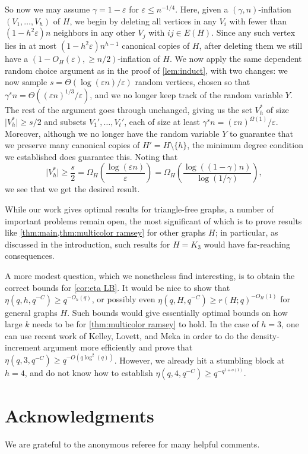 \documentclass{aic}
\theoremstyle{plain}
\theoremstyle{remark}
\newcommand{\eps}{\ensuremath{\varepsilon}}
\newcommand\ab[1]{\lvert #1 \rvert}
\begin{document}
So now we may assume $\gamma = 1-\eps $ for $ \eps \le n^{-1/4}$. Here, given a $(\gamma,n)$-inflation $(V_1,\dots,V_h)$ of $H$, we begin by deleting all vertices in any $V_i$ with fewer than $(1-h^2\eps)n$ neighbors in any other $V_j$ with $ij \in E(H)$. Since any such vertex lies in at most $(1-h^2\eps) n^{h-1}$ canonical copies of $H$, after deleting them we still have a $(1-O_H(\eps), \geq n/2)$-inflation of $H$. We now apply the same dependent random choice argument as in the proof of \cref{lem:induct}, with two changes: we now sample $s = \Theta(\log(\eps n)/\eps)$ random vertices, chosen so that $\gamma^s n = \Theta((\eps n)^{1/3}/\eps)$, and we no longer keep track of the random variable $Y$. The rest of the argument goes through unchanged, giving us the set $V_h^*$ of size $\ab{V_h^*}\geq s/2$ and subsets $V_1',\dots,V_t'$, each of size at least $\gamma^s n = (\eps n)^{\Omega(1)}/\eps$. Moreover, although we no longer have the random variable $Y$ to guarantee that we preserve many canonical copies of $H' = H \setminus \{h\}$, the minimum degree condition we established does guarantee this. Noting that
\[
\ab{V_h^*} \geq \frac s2 = \Omega_H \left(\frac{\log(\eps n)}{\eps}\right) = \Omega_H \left( \frac{\log((1-\gamma)n)}{\log(1/\gamma)}\right),
\]
we see that we get the desired result.

While our work gives optimal results for triangle-free graphs, a number of important problems remain open,
the most significant of which is to prove results like \cref{thm:main,thm:multicolor ramsey} for other graphs $H$; in particular, as discussed in the introduction, such results for $H=K_3$ would have far-reaching consequences.

A more modest question, which we nonetheless find interesting, is to obtain the  correct bounds for \cref{cor:eta LB}. It would be nice to show that $\eta(q,h, q^{-C})\geq q^{-O_h(q)}$, or possibly even $\eta(q, H, q^{-C})\geq r(H;q)^{-O_H(1)}$ for general graphs $H$. Such bounds would give essentially optimal bounds on how large $k$ needs to be for \cref{thm:multicolor ramsey} to hold. In the case of $h=3$, one can use recent work of Kelley, Lovett, and Meka \cite{2308.12451} in order to do the density-increment argument more efficiently and prove that $\eta(q,3,q^{-C})\geq q^{-O(q\log^2(q))}$. However, we already hit a stumbling block at $h=4$, and do not know how to establish $\eta(q,4,q^{-C})\geq q^{-q^{1+o(1)}}$.

\section*{Acknowledgments} We are grateful to the anonymous referee for many helpful comments.
\end{document}
